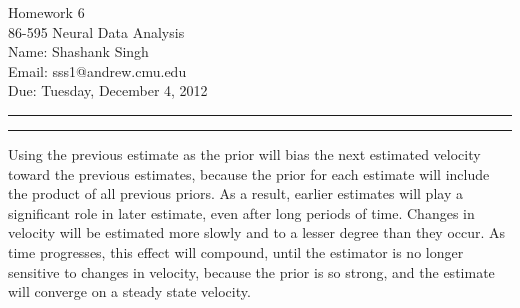 \documentclass[11pt]{article}
\makeatletter
\newcounter{questionCounter}
\newcounter{partCounter}[questionCounter]
\newenvironment{question}[2][\arabic{questionCounter}]{%
    \setcounter{partCounter}{0}%
    \vspace{.25in} \hrule \vspace{0.5em}%
        \noindent{\bf #2}%
    \vspace{0.8em} \hrule \vspace{.10in}%
    \addtocounter{questionCounter}{1}%
}{}
\newcommand{\myname}{Shashank Singh}
\newcommand{\myandrew}{sss1@andrew.cmu.edu}
\newcommand{\myclass}{86-595 Neural Data Analysis}
\newcommand{\myhwnum}{6}
\newcommand{\duedate}{Tuesday, December 4, 2012}
\makeatother
\begin{document}
\thispagestyle{plain}

{\Large Homework \myhwnum} \\
\myclass \\
Name: \myname \\
Email: \myandrew \\
Due: \duedate \\
\begin{question}{Problem 1}
Using the previous estimate as the prior will bias the next estimated velocity
toward the previous estimates, because the prior for each estimate will
include the product of all previous priors. As a result, earlier estimates
will play a significant role in later estimate, even after long periods of
time. Changes in velocity will be estimated more slowly and to a lesser degree
than they occur. As time progresses, this effect will compound, until the
estimator is no longer sensitive to changes in velocity, because the prior is
so strong, and the estimate will converge on a steady state velocity.
\end{question}
\end{document}
